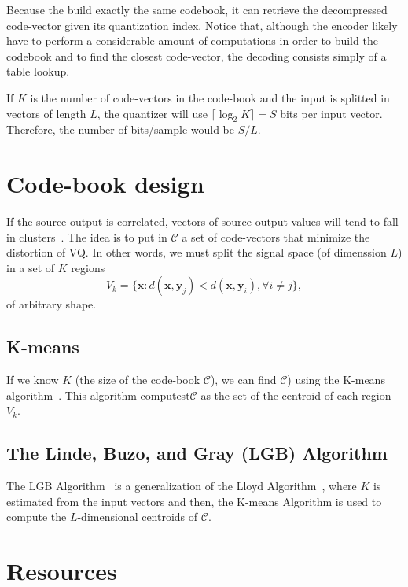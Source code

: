 Because the build exactly the same codebook, it can retrieve the
decompressed code-vector given its quantization index. Notice that,
although the encoder likely have to perform a considerable amount of
computations in order to build the codebook and to find the closest
code-vector, the decoding consists simply of a table lookup.

If $K$ is the number of code-vectors in the code-book and the input is
splitted in vectors of length $L$, the quantizer will use
$\lceil\log_2 K\rceil=S$ bits per input vector. Therefore, the number
of bits/sample would be $S/L$.


\section{Code-book design}

If the source output is correlated, vectors of source output values
will tend to fall in clusters~\cite{sayood2017introduction}. The idea
is to put in $\mathcal{C}$ a set of code-vectors that minimize the
distortion of VQ. In other words, we must split the signal space (of dimenssion $L$) in a set of $K$ regions
\begin{equation}
  V_k=\{\mathbf{x}:d(\mathbf{x},\mathbf{y}_j) <
  d(\mathbf{x},\mathbf{y}_i), \forall i\ne j\},
\end{equation}
of arbitrary shape.

\subsection{K-means}

If we know $K$ (the size of the code-book $\mathcal{C}$), we can find
$\mathcal{C}$) using the K-means
algorithm~\cite{hartigan1979algorithm,sayood2017introduction}. This
algorithm computest$\mathcal{C}$ as the set of the centroid of each
region $V_k$.

\subsection{The Linde, Buzo, and Gray (LGB) Algorithm}

The LGB Algorithm~\cite{linde1980algorithm} is a generalization of the
Lloyd Algorithm~\cite{lloyd1982least}, where $K$ is estimated
from the input vectors and then, the K-means Algorithm is used to
compute the $L$-dimensional centroids of $\mathcal{C}$.


\section{Resources}

\renewcommand{\addcontentsline}[3]{} %

